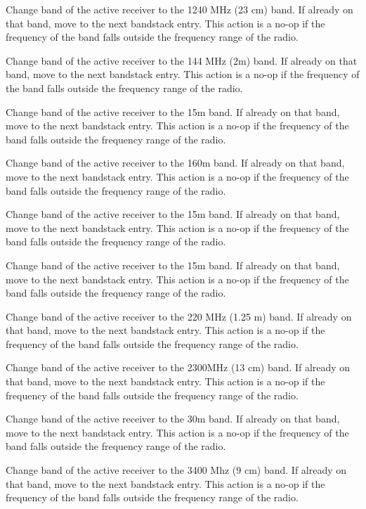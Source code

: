 \documentclass[12pt]{book}
\begin{document}
{Change band of the active receiver to the 1240 MHz (23 cm) band. If already on that band, move to
the next bandstack entry. This action is a no-op if the frequency of the band falls outside the frequency range
of the radio.}

{Change band of the active receiver to the 144 MHz (2m) band. If already on that band, move to
the next bandstack entry. This action is a no-op if the frequency of the band falls outside the frequency range
of the radio.}

{Change band of the active receiver to the 15m band. If already on that band, move to
the next bandstack entry. This action is a no-op if the frequency of the band falls outside the frequency range
of the radio.}

{Change band of the active receiver to the 160m band. If already on that band, move to
the next bandstack entry. This action is a no-op if the frequency of the band falls outside the frequency range
of the radio.}

{Change band of the active receiver to the 15m band. If already on that band, move to
the next bandstack entry. This action is a no-op if the frequency of the band falls outside the frequency range
of the radio.}

{Change band of the active receiver to the 15m band. If already on that band, move to
the next bandstack entry. This action is a no-op if the frequency of the band falls outside the frequency range
of the radio.}

{Change band of the active receiver to the 220 MHz (1.25 m) band. If already on that band, move to
the next bandstack entry. This action is a no-op if the frequency of the band falls outside the frequency range
of the radio.}

{Change band of the active receiver to the 2300MHz (13 cm) band. If already on that band, move to
the next bandstack entry. This action is a no-op if the frequency of the band falls outside the frequency range
of the radio.}

{Change band of the active receiver to the 30m band. If already on that band, move to
the next bandstack entry. This action is a no-op if the frequency of the band falls outside the frequency range
of the radio.}

{Change band of the active receiver to the 3400 Mhz (9 cm) band. If already on that band, move to
the next bandstack entry. This action is a no-op if the frequency of the band falls outside the frequency range
of the radio.}
\end{document}
